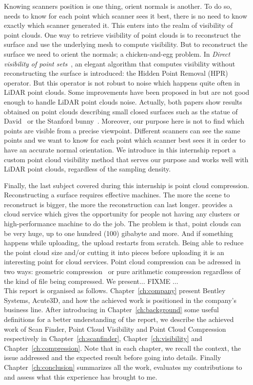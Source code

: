 Knowing scanners position is one thing, orient normals is another. To do so, \CC needs to know for each point which scanner sees it best, there is no need to know exactly which scanner generated it. This enters into the realm of visibility of point clouds. One way to retrieve visibility of point clouds is to reconstruct the surface and use the underlying mesh to compute visibility. But to reconstruct the surface we need to orient the normals; a chicken-and-egg problem. In \emph{Direct visibility of point sets}~\cite{vis1}, an elegant algorithm that computes visibility without reconstructing the surface is introduced: the Hidden Point Removal (HPR) operator. But this operator is not robust to noise which happens quite often in LiDAR point clouds. Some improvements have been proposed in \cite{vis2} but are not good enough to handle LiDAR point clouds noise. Actually, both papers show results obtained on point clouds describing small closed surfaces such as the statue of David~\cite{david} or the Stanford bunny~\cite{bunny}. Moreover, our purpose here is not to find which points are visible from a precise viewpoint. Different scanners can see the same points and we want to know for each point which scanner best sees it in order to have an accurate normal orientation. We introduce in this internship report a custom point cloud visibility method that serves our purpose and works well with LiDAR point clouds, regardless of the sampling density.

Finally, the last subject covered during this internship is point cloud compression. Reconstructing a surface requires effective machines. The more the scene to reconstruct is bigger, the more the reconstruction can last longer. \CC provides a cloud service which gives the opportunity for people not having any clusters or high-performance machine to do the job. The problem is that, point clouds can be very huge, up to one hundred (100) gibabyte and more. And if something happens while uploading, the upload restarts from scratch. Being able to reduce the point cloud size and/or cutting it into pieces before uploading it is an interesting point for \CC cloud services. Point cloud compression can be adressed in two ways: geometric compression~\cite{compress1, compress2} or pure arithmetic compression regardless of the kind of file being compressed. We present... FIXME ...\\

This report is organised as follows. Chapter~\ref{ch:company} present Bentley Systems, Acute3D, \CC and how the achieved work is positioned in the company's business line. After introducing in Chapter~\ref{ch:background} some useful definitions for a better understanding of the report, we describe the achieved work of Scan Finder, Point Cloud Visibility and Point Cloud Compression respectively in Chapter~\ref{ch:scanfinder}, Chapter~\ref{ch:visibility} and
Chapter~\ref{ch:compression}. Note that in each chapter, we recall the context, the issue addressed and the expected result before going into details. Finally Chapter~\ref{ch:conclusion} summarizes all the work, evaluates my contributions to \CC and assess what this experience has brought to me.
